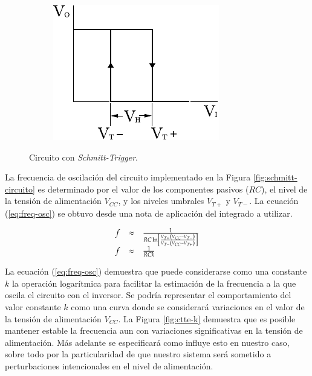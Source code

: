 \documentclass[11pt,a4paper,oneside]{article}
\begin{document}
\begin{figure}[H]
\begin{subfigure}[b]{0.25\textwidth}
    \includegraphics[width=\textwidth]{images/schmitt_trigger_histeresis}    
    \label{fig:schmitt-histeresis}
  \end{subfigure}  
  \caption{Circuito con \textsl{Schmitt-Trigger}.}
\end{figure}

La frecuencia de oscilación del circuito implementado en la Figura \ref{fig:schmitt-circuito} es determinado por el valor de los componentes pasivos ($RC$), el nivel de la tensión de alimentación $V_{CC}$, y los niveles umbrales $V_{T+}$ y $V_{T-}$. La ecuación (\ref{eq:freq-osc}) se obtuvo desde una nota de aplicación del integrado a utilizar. 

\begin{equation}
  \label{eq:freq-osc}
  \begin{array}[h]{r c l}
    f & \approx & 1\over {RC\ln\left[{V_{T+}\left(V_{CC}-V_{T-}\right)}\over{V_{T-}\left(V_{CC}-V_{T+}\right)}\right]}\\
    f & \approx & 1\over {RCk}\\
  \end{array}
\end{equation}

La ecuación (\ref{eq:freq-osc}) demuestra que puede considerarse como una constante $k$ la operación logarítmica para facilitar la estimación de la frecuencia a la que oscila el circuito con el inversor. Se podría representar el comportamiento del valor constante $k$ como una curva donde se considerará variaciones en el valor de la tensión de alimentación $V_{CC}$. La Figura \ref{fig:ctte-k} demuestra que es posible mantener estable la frecuencia aun con variaciones significativas en la tensión de alimentación. Más adelante se especificará como influye esto en nuestro caso, sobre todo por la particularidad de que nuestro sistema será sometido a perturbaciones intencionales en el nivel de alimentación.
\end{document}
